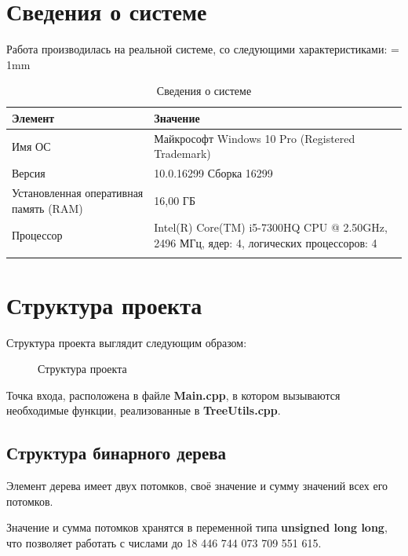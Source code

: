 \section{Сведения о системе}
Работа производилась на реальной системе, со следующими характеристиками:
\tabulinesep = 1mm
\begin{longtabu} to \textwidth {|X[10, c , m ] |X[25, c , m ] | }\firsthline\hline

\textbf{Элемент}&\textbf{Значение}\\ \hline \endfirsthead
	
Имя ОС&Майкрософт Windows 10 Pro (Registered Trademark)\\ \hline
Версия&10.0.16299 Сборка 16299\\ \hline
Установленная оперативная память (RAM) &16,00 ГБ\\ \hline
Процессор&Intel(R) Core(TM) i5-7300HQ CPU @ 2.50GHz, 2496 МГц, ядер: 4, логических процессоров: 4\\ \hline
\caption{Сведения о системе}
\end{longtabu}

\section{Структура проекта}
Структура проекта выглядит следующим образом:
\begin{figure}[H]
\centering
{}
\caption{Структура проекта}
\end{figure}
Точка входа, расположена в файле \textbf{Main.cpp}, в котором вызываются необходимые функции, реализованные в \textbf{TreeUtils.cpp}.
\subsection{Структура бинарного дерева}
Элемент дерева имеет двух потомков, своё значение и сумму значений всех его потомков.

Значение и сумма потомков хранятся в переменной типа \textbf{unsigned long long}, что позволяет работать с числами до 18 446 744 073 709 551 615.

